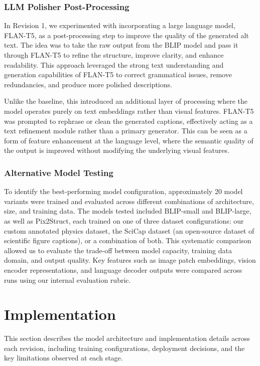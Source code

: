 \documentclass[11pt]{article}
\begin{document}
\subsubsection{LLM Polisher Post-Processing}

In Revision 1, we experimented with incorporating a large language model, FLAN-T5, as a post-processing 
step to improve the quality of the generated alt text. The idea was to take the raw output from the BLIP model 
and pass it through FLAN-T5 to refine the structure, improve clarity, and enhance readability. This approach 
leveraged the strong text understanding and generation capabilities of FLAN-T5 to correct grammatical issues, 
remove redundancies, and produce more polished descriptions.

Unlike the baseline, this introduced an additional layer of processing where the model operates purely on text 
embeddings rather than visual features. FLAN-T5 was prompted to rephrase or clean the generated captions, 
effectively acting as a text refinement module rather than a primary generator. This can be seen as a form 
of feature enhancement at the language level, where the semantic quality of the output is improved without modifying 
the underlying visual features.

\subsubsection{Alternative Model Testing}
To identify the best-performing model configuration, approximately 20 model variants were 
trained and evaluated across different combinations of architecture, size, and training data. 
The models tested included BLIP-small and BLIP-large, as well as Pix2Struct, each trained 
on one of three dataset configurations: our custom annotated physics dataset, the SciCap 
dataset (an open-source dataset of scientific figure captions), or a combination of both. 
This systematic comparison allowed us to evaluate the trade-off between model capacity, 
training data domain, and output quality. Key features such as image patch embeddings, 
vision encoder representations, and language decoder outputs were compared across runs 
using our internal evaluation rubric.


\section{Implementation}

This section describes the model architecture and implementation details across each revision, including training configurations, deployment decisions, and the key limitations observed at each stage.
\end{document}
